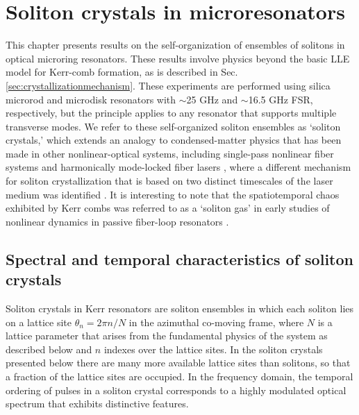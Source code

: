  \chapter{Soliton crystals in microresonators} \label{ch:SolitonCrystals}

This chapter presents results on the self-organization of ensembles of solitons in optical microring resonators. These results involve physics beyond the basic LLE model for Kerr-comb formation, as is described in Sec. \ref{sec:crystallizationmechanism}. These experiments are performed using silica microrod \cite{DelHaye2013} and microdisk \cite{Lee2012} resonators with $\sim$25 GHz and $\sim$16.5 GHz FSR, respectively, but the principle applies to any resonator that supports multiple transverse modes. We refer to these self-organized soliton ensembles as `soliton crystals,' which extends an analogy to condensed-matter physics that has been made in other nonlinear-optical systems, including single-pass nonlinear fiber systems \cite{Zajnulina2017} and harmonically mode-locked fiber lasers \cite{Haboucha2008,Amrani2011a}, where a different mechanism for soliton crystallization that is based on two distinct timescales of the laser medium was identified \cite{Haboucha2008c}. It is interesting to note that the spatiotemporal chaos exhibited by Kerr combs was referred to as a `soliton gas' in early studies of nonlinear dynamics in passive fiber-loop resonators \cite{Malomed1998,Mitschke1998,Schwache1997}. 

\section{Spectral and temporal characteristics of soliton crystals}

Soliton crystals in Kerr resonators are soliton ensembles in which each soliton lies on a lattice site $\theta_n= 2\pi n/N$ in the azimuthal co-moving frame, where $N$ is a lattice parameter that arises from the fundamental physics of the system as described below and $n$ indexes over the lattice sites. In the soliton crystals presented below there are many more available lattice sites than solitons, so that a fraction of the lattice sites are occupied. In the frequency domain, the temporal ordering of pulses in a soliton crystal corresponds to a highly modulated optical spectrum that exhibits distinctive features. 

